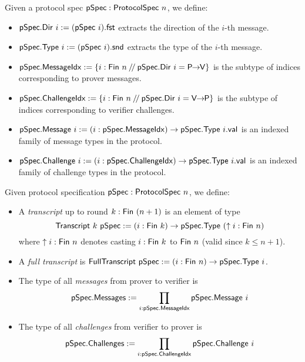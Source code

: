 \begin{definition}
    \label{def:protocol_spec_components}
    Given a protocol spec $\mathsf{pSpec} : \mathsf{ProtocolSpec}\ n$, we define:
    \begin{itemize}
        \item $\pSpec.\Dir\ i := (\pSpec\ i).\mathsf{fst}$ extracts the direction of the $i$-th message.
        \item $\pSpec.\Type\ i := (\pSpec\ i).\mathsf{snd}$ extracts the type of the $i$-th message.
        \item $\mathsf{pSpec}.\mathsf{MessageIdx} := \{i : \mathsf{Fin}\ n \mathbin{/\!/} \mathsf{pSpec}.\mathsf{Dir}\ i = \mathsf{P \!\!\rightarrow\!\! V}\}$ is the subtype of indices corresponding to prover messages.
        \item $\mathsf{pSpec}.\mathsf{ChallengeIdx} := \{i : \mathsf{Fin}\ n \mathbin{/\!/} \mathsf{pSpec}.\mathsf{Dir}\ i = \mathsf{V \!\!\rightarrow\!\! P}\}$ is the subtype of indices corresponding to verifier challenges.
        \item $\mathsf{pSpec}.\mathsf{Message}\ i := (i : \mathsf{pSpec}.\mathsf{MessageIdx}) \to \mathsf{pSpec}.\mathsf{Type}\ i.\mathsf{val}$ is an indexed family of message types in the protocol.
        \item $\mathsf{pSpec}.\mathsf{Challenge}\ i := (i : \mathsf{pSpec}.\mathsf{ChallengeIdx}) \to \mathsf{pSpec}.\mathsf{Type}\ i.\mathsf{val}$ is an indexed family of challenge types in the protocol.
    \end{itemize}
\end{definition}

\begin{definition}
    \label{def:transcript}
        Given protocol specification $\mathsf{pSpec} : \mathsf{ProtocolSpec}\ n$, we define:
    \begin{itemize}
        \item A \emph{transcript} up to round $k : \mathsf{Fin}\ (n + 1)$ is an element of type
                \[ \mathsf{Transcript}\ k\ \mathsf{pSpec} := (i : \mathsf{Fin}\ k) \to \mathsf{pSpec}.\mathsf{Type}\ (\uparrow i : \mathsf{Fin}\ n) \]
        where $\uparrow i : \mathsf{Fin}\ n$ denotes casting $i : \mathsf{Fin}\ k$ to $\mathsf{Fin}\ n$ (valid since $k \leq n + 1$).

        \item A \emph{full transcript} is $\mathsf{FullTranscript}\ \mathsf{pSpec} := (i : \mathsf{Fin}\ n) \to \mathsf{pSpec}.\mathsf{Type}\ i$.

        \item The type of all \emph{messages} from prover to verifier is
        \[ \mathsf{pSpec}.\mathsf{Messages} := \prod_{i : \mathsf{pSpec}.\mathsf{MessageIdx}} \mathsf{pSpec}.\mathsf{Message}\ i \]

        \item The type of all \emph{challenges} from verifier to prover is
        \[ \mathsf{pSpec}.\mathsf{Challenges} := \prod_{i : \mathsf{pSpec}.\mathsf{ChallengeIdx}} \mathsf{pSpec}.\mathsf{Challenge}\ i \]
    \end{itemize}
\end{definition}

